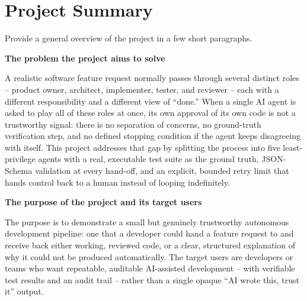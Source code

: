 \documentclass[11pt,a4paper]{article}
\newcommand{\sectionintro}[1]{\textcolor{courseGray}{\small #1}\par\vspace{2pt}}
\newcommand{\answerarea}[2]{\textbf{#1}\par\begin{answerbox}#2\end{answerbox}}
\begin{document}
\tableofcontents
\newpage

\section{Project Summary}
\sectionintro{Provide a general overview of the project in a few short paragraphs.}

\answerarea{The problem the project aims to solve}{
A realistic software feature request normally passes through several distinct roles --
product owner, architect, implementer, tester, and reviewer -- each with a different
responsibility and a different view of ``done.'' When a single AI agent is asked to play
all of these roles at once, its own approval of its own code is not a trustworthy signal:
there is no separation of concerns, no ground-truth verification step, and no defined
stopping condition if the agent keeps disagreeing with itself. This project addresses that
gap by splitting the process into five least-privilege agents with a real, executable test
suite as the ground truth, JSON-Schema validation at every hand-off, and an explicit,
bounded retry limit that hands control back to a human instead of looping indefinitely.
}

\answerarea{The purpose of the project and its target users}{
The purpose is to demonstrate a small but genuinely trustworthy autonomous development
pipeline: one that a developer could hand a feature request to and receive back either
working, reviewed code, or a clear, structured explanation of why it could not be produced
automatically. The target users are developers or teams who want repeatable,
auditable AI-assisted development -- with verifiable test results and an audit trail --
rather than a single opaque ``AI wrote this, trust it'' output.
}
\end{document}
